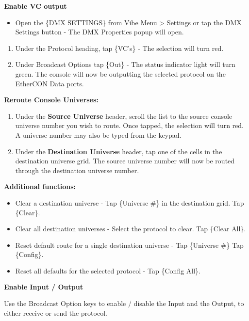 \documentclass[
]{article}
\providecommand{\tightlist}{%
  \setlength{\itemsep}{0pt}\setlength{\parskip}{0pt}}
\begin{document}
\textbf{Enable VC output}

\begin{itemize}
\tightlist
\item
  Open the \{DMX SETTINGS\} from Vibe Menu \textgreater{} Settings or tap the DMX Settings button - The DMX Properties popup will open.
\end{itemize}

\begin{enumerate}
\def\labelenumi{\arabic{enumi}.}
\item
  Under the Protocol heading, tap \{VC's\} - The selection will turn red.
\item
  Under Broadcast Options tap \{Out\} - The status indicator light will turn green. The console will now be outputting the selected protocol on the EtherCON Data ports.
\end{enumerate}

\textbf{Reroute Console Universes:}

\begin{enumerate}
\def\labelenumi{\arabic{enumi}.}
\item
  Under the \textbf{Source Universe} header, scroll the list to the source console universe number you wish to route. Once tapped, the selection will turn red. A universe number may also be typed from the keypad.
\item
  Under the \textbf{Destination Universe} header, tap one of the cells in the destination universe grid. The source universe number will now be routed through the destination universe number.
\end{enumerate}

\textbf{Additional functions:}

\begin{itemize}
\item
  Clear a destination universe - Tap \{Universe \#\} in the destination grid. Tap \{Clear\}.
\item
  Clear all destination universes - Select the protocol to clear. Tap \{Clear All\}.
\item
  Reset default route for a single destination universe - Tap \{Universe \#\} Tap \{Config\}.
\item
  Reset all defaults for the selected protocol - Tap \{Config All\}.
\end{itemize}

\textbf{Enable Input / Output}

Use the Broadcast Option keys to enable / disable the Input and the Output, to either receive or send the protocol.
\end{document}
